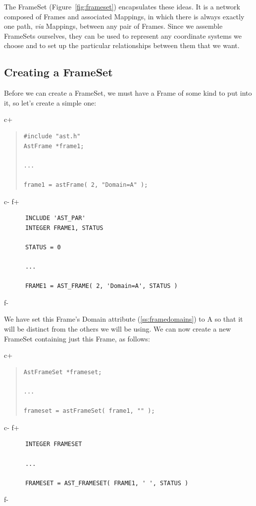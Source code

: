 \documentclass[twoside,11pt]{article}
\newcommand{\secref}[1]{\S\ref{#1}}
\renewcommand{\secref}[1]{\ref{#1}}
\begin{document}
The FrameSet (Figure~\ref{fig:frameset}) encapsulates these ideas.  It
is a network composed of Frames and associated Mappings, in which
there is always exactly one path, {\em{via}} Mappings, between any
pair of Frames.  Since we assemble FrameSets ourselves, they can be
used to represent any coordinate systems we choose and to set up the
particular relationships between them that we want.

\subsection{\label{ss:creatingaframeset}Creating a FrameSet}

Before we can create a FrameSet, we must have a Frame of some kind to
put into it, so let's create a simple one:

c+
\begin{quote}
\small
\begin{verbatim}
#include "ast.h"
AstFrame *frame1;

...

frame1 = astFrame( 2, "Domain=A" );
\end{verbatim}
\normalsize
\end{quote}
c-
f+
\small
\begin{verbatim}
      INCLUDE 'AST_PAR'
      INTEGER FRAME1, STATUS

      STATUS = 0

      ...

      FRAME1 = AST_FRAME( 2, 'Domain=A', STATUS )
\end{verbatim}
\normalsize
f-

We have set this Frame's Domain attribute (\secref{ss:framedomains}) to
A so that it will be distinct from the others we will be using. We can
now create a new FrameSet containing just this Frame, as follows:

c+
\begin{quote}
\small
\begin{verbatim}
AstFrameSet *frameset;

...

frameset = astFrameSet( frame1, "" );
\end{verbatim}
\normalsize
\end{quote}
c-
f+
\small
\begin{verbatim}
      INTEGER FRAMESET

      ...

      FRAMESET = AST_FRAMESET( FRAME1, ' ', STATUS )
\end{verbatim}
\normalsize
f-
\end{document}
